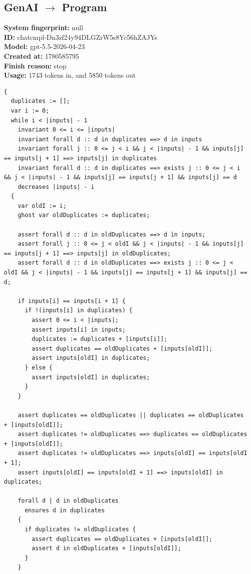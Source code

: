 \documentclass{article}
\begin{document}
\subsection*{GenAI $\rightarrow$ Program}
\textbf{System fingerprint: }null
\\\textbf{ID: }chatcmpl-Dn3zf24y94DLGZrW5s8Yc56hZAJYs
\\\textbf{Model: }gpt-5.5-2026-04-23
\\\textbf{Created at: }1780585795
\\\textbf{Finish reason: }stop
\\\textbf{Usage: }1743 tokens in, and 5850 tokens out
\begin{lstlisting}
{
  duplicates := [];
  var i := 0;
  while i < |inputs| - 1
    invariant 0 <= i <= |inputs|
    invariant forall d :: d in duplicates ==> d in inputs
    invariant forall j :: 0 <= j < i && j < |inputs| - 1 && inputs[j] == inputs[j + 1] ==> inputs[j] in duplicates
    invariant forall d :: d in duplicates ==> exists j :: 0 <= j < i && j < |inputs| - 1 && inputs[j] == inputs[j + 1] && inputs[j] == d
    decreases |inputs| - i
  {
    var oldI := i;
    ghost var oldDuplicates := duplicates;

    assert forall d :: d in oldDuplicates ==> d in inputs;
    assert forall j :: 0 <= j < oldI && j < |inputs| - 1 && inputs[j] == inputs[j + 1] ==> inputs[j] in oldDuplicates;
    assert forall d :: d in oldDuplicates ==> exists j :: 0 <= j < oldI && j < |inputs| - 1 && inputs[j] == inputs[j + 1] && inputs[j] == d;

    if inputs[i] == inputs[i + 1] {
      if !(inputs[i] in duplicates) {
        assert 0 <= i < |inputs|;
        assert inputs[i] in inputs;
        duplicates := duplicates + [inputs[i]];
        assert duplicates == oldDuplicates + [inputs[oldI]];
        assert inputs[oldI] in duplicates;
      } else {
        assert inputs[oldI] in duplicates;
      }
    }

    assert duplicates == oldDuplicates || duplicates == oldDuplicates + [inputs[oldI]];
    assert duplicates != oldDuplicates ==> duplicates == oldDuplicates + [inputs[oldI]];
    assert duplicates != oldDuplicates ==> inputs[oldI] == inputs[oldI + 1];
    assert inputs[oldI] == inputs[oldI + 1] ==> inputs[oldI] in duplicates;

    forall d | d in oldDuplicates
      ensures d in duplicates
    {
      if duplicates != oldDuplicates {
        assert duplicates == oldDuplicates + [inputs[oldI]];
        assert d in oldDuplicates + [inputs[oldI]];
      }
    }


\end{lstlisting}
\end{document}
